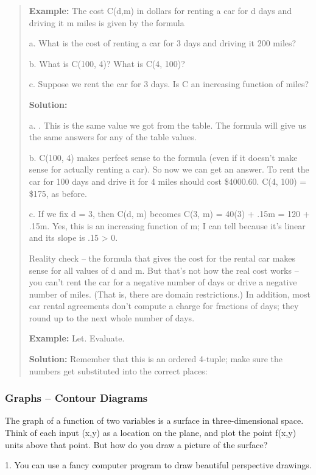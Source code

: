 \begin{quote}
\textbf{Example:} The cost C(d,m) in dollars for renting a car for d
days and driving it m miles is given by the formula

a. What is the cost of renting a car for 3 days and driving it 200
miles?

b. What is C(100, 4)? What is C(4, 100)?

c. Suppose we rent the car for 3 days. Is C an increasing function of
miles?

\textbf{Solution: }

a. . This is the same value we got from the table. The formula will give
us the same answers for any of the table values.

b. C(100, 4) makes perfect sense to the formula (even if it doesn't make
sense for actually renting a car). So now we can get an answer. To rent
the car for 100 days and drive it for 4 miles should cost \$4000.60.
C(4, 100) = \$175, as before.

c. If we fix d = 3, then C(d, m) becomes C(3, m) = 40(3) + .15m = 120 +
.15m. Yes, this is an increasing function of m; I can tell because it's
linear and its slope is .15 \textgreater{} 0.

Reality check -- the formula that gives the cost for the rental car
makes sense for all values of d and m. But that's not how the real cost
works -- you can't rent the car for a negative number of days or drive a
negative number of miles. (That is, there are domain restrictions.) In
addition, most car rental agreements don't compute a charge for
fractions of days; they round up to the next whole number of days.

\textbf{Example:} Let. Evaluate.

\textbf{Solution:} Remember that this is an ordered 4-tuple; make sure
the numbers get substituted into the correct places:
\end{quote}

\subsubsection{Graphs -- Contour
Diagrams}\label{graphs-contour-diagrams}

The graph of a function of two variables is a surface in
three-dimensional space. Think of each input (x,y) as a location on the
plane, and plot the point f(x,y) units above that point. But how do you
draw a picture of the surface?

1. You can use a fancy computer program to draw beautiful perspective
drawings.

